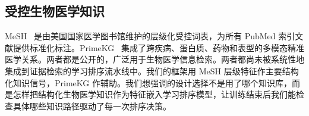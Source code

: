 \subsection{受控生物医学知识}

MeSH~\citep{nlm2026mesh} 是由美国国家医学图书馆维护的层级化受控词表，为所有 PubMed 索引文献提供标准化标注。PrimeKG~\citep{chandak2023primekg} 集成了跨疾病、蛋白质、药物和表型的多模态精准医学关系。两者都是公开的，广泛用于生物医学信息检索。两者都尚未被系统性地集成到证据检索的学习排序流水线中。我们的框架用 MeSH 层级特征作主要结构化知识信号，PrimeKG 作辅助。我们想强调的设计选择不是用了哪个知识库，而是怎样把结构化生物医学知识作为特征嵌入学习排序模型，让训练结束后我们能检查具体哪些知识路径驱动了每一次排序决策。
